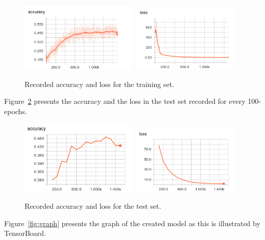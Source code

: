 \documentclass{article}
\begin{document}
\begin{figure}
\centering
\includegraphics[width=0.5\textwidth]{loss.png}\	
\includegraphics[width=0.45\textwidth]{accuracy.png}
\caption{Recorded accuracy and loss for the training set.}
\label{fig:acclosstrain}
\end{figure}

Figure~\ref{fig:acclosstest} presents the accuracy and the loss in the test set recorded for every 100-epochs.

\begin{figure}
\centering
\includegraphics[width=0.5\textwidth]{accuracy_t.png}\	
\includegraphics[width=0.45\textwidth]{loss_t.png}
\caption{Recorded accuracy and loss for the test set.}
\label{fig:acclosstest}
\end{figure}

Figure~\ref{fig:graph} presents the graph of the created model as this is illustrated by TensorBoard.
\end{document}
